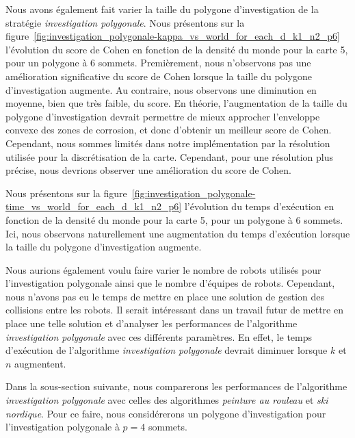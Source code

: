 \documentclass[english,RandD]{rapportPFE}  %
\begin{document}
			Nous avons également fait varier la taille du polygone d'investigation de la stratégie \textit{investigation polygonale}.
			Nous présentons sur la figure~\ref{fig:investigation_polygonale-kappa_vs_world_for_each_d_k1_n2_p6} l'évolution du score de Cohen en fonction de la densité du monde pour la carte 5, pour un polygone à 6 sommets.
			Premièrement, nous n'observons pas une amélioration significative du score de Cohen lorsque la taille du polygone d'investigation augmente.
			Au contraire, nous observons une diminution en moyenne, bien que très faible, du score.
			En théorie, l'augmentation de la taille du polygone d'investigation devrait permettre de mieux approcher l'enveloppe convexe des zones de corrosion, et donc d'obtenir un meilleur score de Cohen.
			Cependant, nous sommes limités dans notre implémentation par la résolution utilisée pour la discrétisation de la carte.
			Cependant, pour une résolution plus précise, nous devrions observer une amélioration du score de Cohen.

			Nous présentons sur la figure~\ref{fig:investigation_polygonale-time_vs_world_for_each_d_k1_n2_p6} l'évolution du temps d'exécution en fonction de la densité du monde pour la carte 5, pour un polygone à 6 sommets.
			Ici, nous observons naturellement une augmentation du temps d'exécution lorsque la taille du polygone d'investigation augmente.

			Nous aurions également voulu faire varier le nombre de robots utilisés pour l'investigation polygonale ainsi que le nombre d'équipes de robots.
			Cependant, nous n'avons pas eu le temps de mettre en place une solution de gestion des collisions entre les robots.
			Il serait intéressant dans un travail futur de mettre en place une telle solution et d'analyser les performances de l'algorithme \textit{investigation polygonale} avec ces différents paramètres.
			En effet, le temps d'exécution de l'algorithme \textit{investigation polygonale} devrait diminuer lorsque $k$ et $n$ augmentent.

			Dans la sous-section suivante, nous comparerons les performances de l'algorithme \textit{investigation polygonale} avec celles des algorithmes \textit{peinture au rouleau} et \textit{ski nordique}.
			Pour ce faire, nous considérerons un polygone d'investigation pour l'investigation polygonale à $p = 4$ sommets.
\end{document}
